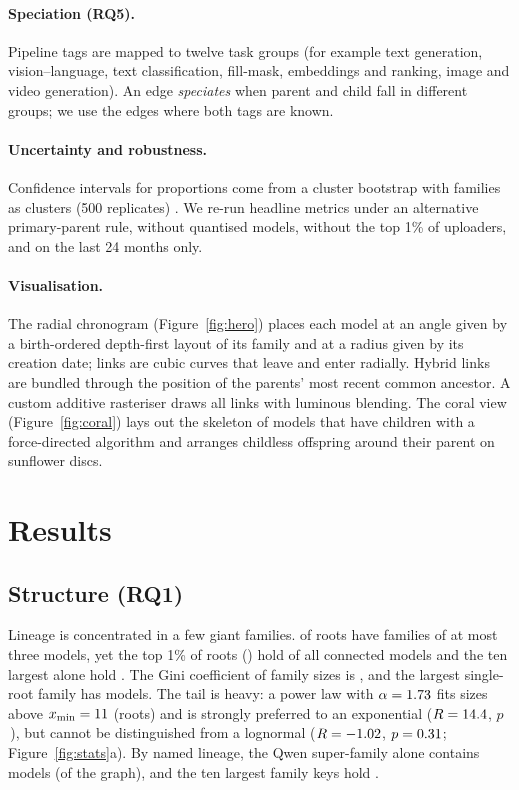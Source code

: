 \documentclass[11pt]{article}
\newcommand{\RQ}[1]{\textbf{RQ#1}}
\begin{document}
\paragraph{Speciation (\RQ5).} Pipeline tags are mapped to twelve task groups (for example text generation, vision--language, text classification, fill-mask, embeddings and ranking, image and video generation). An edge \emph{speciates} when parent and child fall in different groups; we use the \nTaskEdges edges where both tags are known.

\paragraph{Uncertainty and robustness.} Confidence intervals for proportions come from a cluster bootstrap with families as clusters (500 replicates) \citep{efron1993}. We re-run headline metrics under an alternative primary-parent rule, without quantised models, without the top 1\% of uploaders, and on the last 24 months only.

\paragraph{Visualisation.} The radial chronogram (Figure~\ref{fig:hero}) places each model at an angle given by a birth-ordered depth-first layout of its family and at a radius given by its creation date; links are cubic curves that leave and enter radially. Hybrid links are bundled through the position of the parents' most recent common ancestor. A custom additive rasteriser draws all \nEdges links with luminous blending. The coral view (Figure~\ref{fig:coral}) lays out the skeleton of models that have children with a force-directed algorithm and arranges childless offspring around their parent on sunflower discs.

\section{Results}
\subsection{Structure (\RQ1)}
Lineage is concentrated in a few giant families. \pctRootsSmall of roots have families of at most three models, yet the top 1\% of roots (\nTopOnePctRoots) hold \pctTopOnePctRoots of all connected models and the ten largest alone hold \pctTopTenRoots. The Gini coefficient of family sizes is \giniFamily, and the largest single-root family has \familyMax models. The tail is heavy: a power law with $\alpha=1.73$ fits sizes above $x_{\min}=11$ (\plNtail roots) and is strongly preferred to an exponential ($R=14.4$, $p$\,\plExP), but cannot be distinguished from a lognormal ($R=-1.02$, $p=0.31$; Figure~\ref{fig:stats}a). By named lineage, the Qwen super-family alone contains \nQwenSuper models (\pctQwenSuper of the graph), and the ten largest family keys hold \pctTopTenKeys.
\end{document}
